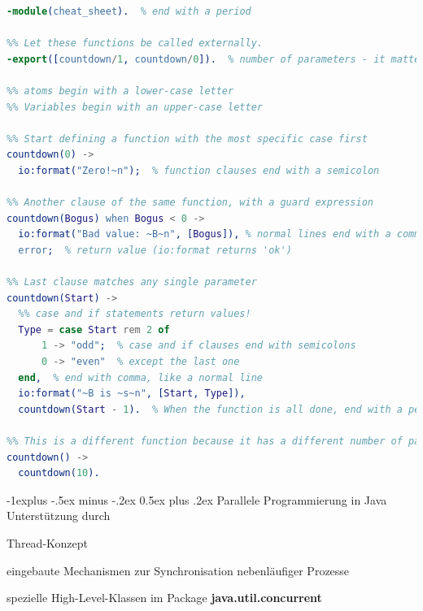 \documentclass[10pt]{article}
\makeatletter
\renewcommand{\subsection}{\@startsection{subsection}{2}{0mm}%
                                {-1explus -.5ex minus -.2ex}%
                                {0.5ex plus .2ex}%
                                {\normalfont\normalsize\bfseries}}
\makeatother
\begin{document}
\begin{lstlisting}[language=erlang]
%[Hello.erl]
-module(cheat_sheet).  % end with a period

%% Let these functions be called externally.
-export([countdown/1, countdown/0]).  % number of parameters - it matters!

%% atoms begin with a lower-case letter
%% Variables begin with an upper-case letter

%% Start defining a function with the most specific case first
countdown(0) ->  
  io:format("Zero!~n");  % function clauses end with a semicolon

%% Another clause of the same function, with a guard expression
countdown(Bogus) when Bogus < 0 ->
  io:format("Bad value: ~B~n", [Bogus]), % normal lines end with a comma
  error;  % return value (io:format returns 'ok')
  
%% Last clause matches any single parameter
countdown(Start) ->
  %% case and if statements return values!
  Type = case Start rem 2 of
      1 -> "odd";  % case and if clauses end with semicolons
      0 -> "even"  % except the last one
  end,  % end with comma, like a normal line
  io:format("~B is ~s~n", [Start, Type]), 
  countdown(Start - 1).  % When the function is all done, end with a period

%% This is a different function because it has a different number of parameters.
countdown() ->
  countdown(10).
\end{lstlisting}


\subsection{Parallele Programmierung in Java}
Unterstützung durch
\begin{itemize*}
  \item Thread-Konzept
  \item eingebaute Mechanismen zur Synchronisation nebenläufiger Prozesse
  \item spezielle High-Level-Klassen im Package
  \newline \textbf{java.util.concurrent}
\end{itemize*}
\end{document}
